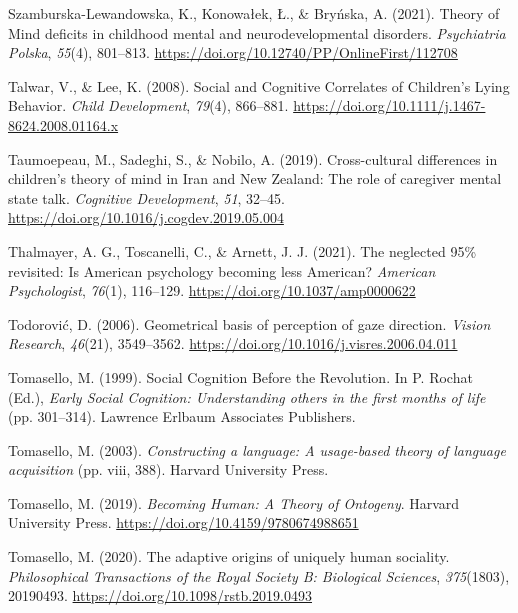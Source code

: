 \documentclass[
]{scrbook}
\newlength{\cslhangindent}
\newenvironment{CSLReferences}[2] %
 {\begin{list}{}{%
  \setlength{\itemindent}{0pt}
  \setlength{\leftmargin}{0pt}
  \setlength{\parsep}{0pt}
  \ifodd #1
   \setlength{\leftmargin}{\cslhangindent}
   \setlength{\itemindent}{-1\cslhangindent}
  \fi
  \setlength{\itemsep}{#2\baselineskip}}}
 {\end{list}}
\begin{document}
\begin{CSLReferences}{1}{0}
Szamburska-Lewandowska, K., Konowałek, Ł., \& Bryńska, A. (2021). Theory of {Mind} deficits in childhood mental and neurodevelopmental disorders. \emph{Psychiatria Polska}, \emph{55}(4), 801--813. \url{https://doi.org/10.12740/PP/OnlineFirst/112708}

Talwar, V., \& Lee, K. (2008). Social and {Cognitive Correlates} of {Children}'s {Lying Behavior}. \emph{Child Development}, \emph{79}(4), 866--881. \url{https://doi.org/10.1111/j.1467-8624.2008.01164.x}

Taumoepeau, M., Sadeghi, S., \& Nobilo, A. (2019). Cross-cultural differences in children's theory of mind in {Iran} and {New Zealand}: {The} role of caregiver mental state talk. \emph{Cognitive Development}, \emph{51}, 32--45. \url{https://doi.org/10.1016/j.cogdev.2019.05.004}

Thalmayer, A. G., Toscanelli, C., \& Arnett, J. J. (2021). The neglected 95\% revisited: {Is American} psychology becoming less {American}? \emph{American Psychologist}, \emph{76}(1), 116--129. \url{https://doi.org/10.1037/amp0000622}

Todorović, D. (2006). Geometrical basis of perception of gaze direction. \emph{Vision Research}, \emph{46}(21), 3549--3562. \url{https://doi.org/10.1016/j.visres.2006.04.011}

Tomasello, M. (1999). Social {Cognition Before} the {Revolution}. In P. Rochat (Ed.), \emph{Early {Social Cognition}: {Understanding} others in the first months of life} (pp. 301--314). Lawrence Erlbaum Associates Publishers.

Tomasello, M. (2003). \emph{Constructing a language: {A} usage-based theory of language acquisition} (pp. viii, 388). Harvard University Press.

Tomasello, M. (2019). \emph{Becoming {Human}: {A Theory} of {Ontogeny}}. Harvard University Press. \url{https://doi.org/10.4159/9780674988651}

Tomasello, M. (2020). The adaptive origins of uniquely human sociality. \emph{Philosophical Transactions of the Royal Society B: Biological Sciences}, \emph{375}(1803), 20190493. \url{https://doi.org/10.1098/rstb.2019.0493}


\end{CSLReferences}
\end{document}
